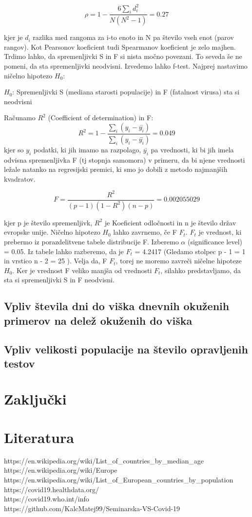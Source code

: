\documentclass[a4paper,11pt]{article}
\begin{document}
\begin{center}
\[\rho = 1 - \frac{6\sum_{i}{}d_i^2}{N(N^2 - 1)} = 0.27\]
\end{center} 
kjer je \( d_i \) razlika med rangoma za i-to enoto in N pa število vseh enot (parov rangov).
Kot Pearsonov koeficient tudi Spearmanov koeficient je zelo majhen. Trdimo lahko, da spremenljivki S in F si nista močno povezani. To seveda še ne pomeni, da sta spremenljivki neodvisni. Izvedemo lahko f-test. Najprej nastavimo ničelno hipotezo \( H_0 \):
\begin{center}
\( H_0 \): Spremenljivki S (mediana starosti populacije) in F (fatalnost virusa) sta si neodvisni
\end{center}
Računamo \( R^2 \) (Coefficient of determination) in F:
\[R^2 = 1 - \frac{\sum_{i}{}(y_i - \overset{..}{y_i})}{\sum_{i}{}(y_i - \overset{-}{y_i})} = 0.049\]
kjer so \(y_i\) podatki, ki jih imamo na razpolago, \(\overset{..}{y_i}\) pa vrednosti, ki bi jih imela odvisna spremenljivka F (tj stopnja samomora) v primeru, da bi njene vrednosti ležale natanko na regresijski premici, ki smo jo dobili z metodo najmanjših kvadratov.

\[F = \frac{R^2}{(p - 1)(1 - R^2)(n - p)} = 0.002055029 \]

kjer p je število spremenljivk, \( R^2 \) je Koeficient odločnosti in n je število držav evropske unije. Ničelno hipotezo \( H_0 \) lahko zavrnemo, če F \ge \(F_t \). \(F_t\) je vrednost, ki prebermo iz porazdelitvene tabele distribucije F. Izberemo \(\alpha\) (significance level) = 0.05. Iz tabele lahko razberemo, da je \( F_t \) = 4.2417 (Gledamo stolpec p - 1 = 1 in vrstico n - 2 = 25 ). Velja da, F \lt \(F_t\), torej ne moremo zavreči ničelne hipoteze \(H_0\). Ker je vrednost F veliko manjša od vrednosti \(F_t\), silahko predstavljamo, da sta si spremenljivki S in F neodvisni.

\subsection{Vpliv števila dni do viška dnevnih okuženih primerov na delež okuženih do viška}
\subsection{Vpliv velikosti populacije na število opravljenih testov}


\section{Zaključki}
\section{Literatura}
https://en.wikipedia.org/wiki/List_of_countries_by_median_age \\
https://en.wikipedia.org/wiki/Europe \\
https://en.wikipedia.org/wiki/List_of_European_countries_by_population \\
https://covid19.healthdata.org/ \\
https://covid19.who.int/info \\
https://github.com/KalcMatej99/Seminarska-VS-Covid-19 \\
\end{document}
